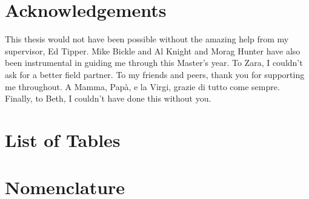 \documentclass[hidelinks, 12pt]{article} %
\begin{document}

\newpage


\tableofcontents


\newpage


\section*{Acknowledgements}

This thesis would not have been possible without the amazing help from my supervisor, Ed Tipper. Mike Bickle and Al Knight and Morag Hunter have also been instrumental in guiding me through this Master's year. To Zara, I couldn't ask for a better field partner. To my friends and peers, thank you for supporting me throughout. A Mamma, Papà, e la Virgi, grazie di tutto come sempre. Finally, to Beth, I couldn't have done this without you.


\newpage


\section*{List of Tables}

\newpage



\section*{Nomenclature}


\newpage


\FloatBarrier







\newpage




\newpage





\newpage





\newpage





\newpage

\nocite{*}

 
 

\newpage


\end{document}
